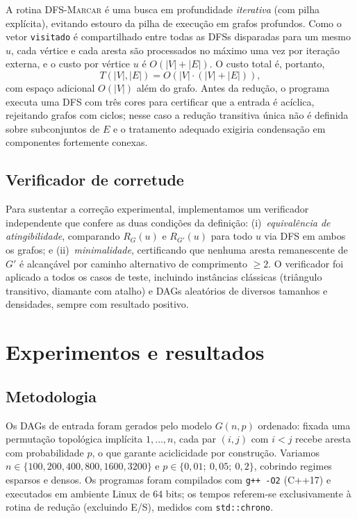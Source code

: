 \documentclass[10pt,twocolumn]{article}
\begin{document}
A rotina \textsc{DFS-Marcar} é uma busca em profundidade \emph{iterativa} (com pilha explícita), evitando estouro da pilha de execução em grafos profundos. Como o vetor \texttt{visitado} é compartilhado entre todas as DFSs disparadas para um mesmo $u$, cada vértice e cada aresta são processados no máximo uma vez por iteração externa, e o custo por vértice $u$ é $O(|V|+|E|)$. O custo total é, portanto,
\[
T(|V|,|E|) = O\!\left(|V|\cdot(|V|+|E|)\right),
\]
com espaço adicional $O(|V|)$ além do grafo. Antes da redução, o programa executa uma DFS com três cores para certificar que a entrada é acíclica, rejeitando grafos com ciclos; nesse caso a redução transitiva única não é definida sobre subconjuntos de $E$ e o tratamento adequado exigiria condensação em componentes fortemente conexas.

\subsection{Verificador de corretude}

Para sustentar a correção experimental, implementamos um verificador independente que confere as duas condições da definição: (i)~\emph{equivalência de atingibilidade}, comparando $R_G(u)$ e $R_{G'}(u)$ para todo $u$ via DFS em ambos os grafos; e (ii)~\emph{minimalidade}, certificando que nenhuma aresta remanescente de $G'$ é alcançável por caminho alternativo de comprimento $\geq 2$. O verificador foi aplicado a todos os casos de teste, incluindo instâncias clássicas (triângulo transitivo, diamante com atalho) e DAGs aleatórios de diversos tamanhos e densidades, sempre com resultado positivo.

\section{Experimentos e resultados}
\label{sec:exp}

\subsection{Metodologia}

Os DAGs de entrada foram gerados pelo modelo $G(n,p)$ ordenado: fixada uma permutação topológica implícita $1,\dots,n$, cada par $(i,j)$ com $i<j$ recebe aresta com probabilidade $p$, o que garante aciclicidade por construção. Variamos $n \in \{100, 200, 400, 800, 1600, 3200\}$ e $p \in \{0{,}01;\ 0{,}05;\ 0{,}2\}$, cobrindo regimes esparsos e densos. Os programas foram compilados com \texttt{g++ -O2} (C++17) e executados em ambiente Linux de 64 bits; os tempos referem-se exclusivamente à rotina de redução (excluindo E/S), medidos com \texttt{std::chrono}.
\end{document}
